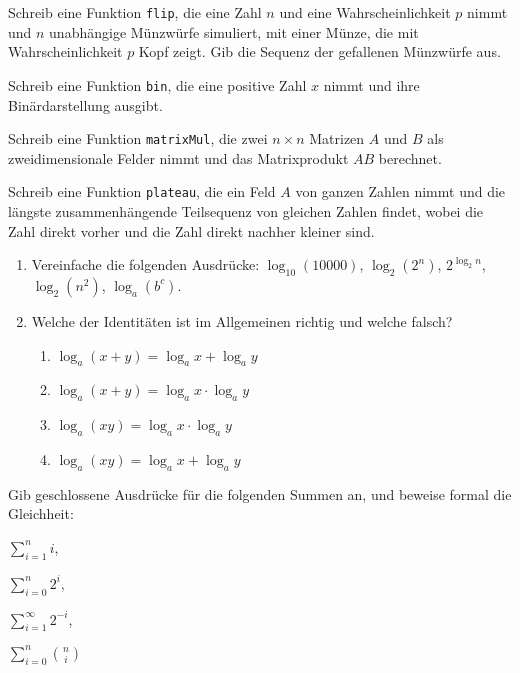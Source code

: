 \documentclass{uebung_cs}
\begin{document}
\begin{aufgabe}
    Schreib eine Funktion \texttt{flip}, die eine Zahl $n$ und eine Wahrscheinlichkeit $p$ nimmt und $n$ unabhängige Münzwürfe simuliert, mit einer Münze, die mit Wahrscheinlichkeit $p$ Kopf zeigt. Gib die Sequenz der gefallenen Münzwürfe aus.
\end{aufgabe}

\begin{aufgabe}[Binärzahlen]
    Schreib eine Funktion \texttt{bin}, die eine positive Zahl $x$ nimmt und ihre Binärdarstellung ausgibt.
\end{aufgabe}

\begin{aufgabe}[Matrixmultiplikation]
    Schreib eine Funktion \texttt{matrixMul}, die zwei $n\times n$ Matrizen $A$ und $B$ als zweidimensionale Felder nimmt und das Matrixprodukt $AB$ berechnet.
\end{aufgabe}

\begin{aufgabe}
    Schreib eine Funktion \texttt{plateau}, die ein Feld $A$ von ganzen Zahlen nimmt und die längste zusammenhängende Teilsequenz von gleichen Zahlen findet, wobei die Zahl direkt vorher und die Zahl direkt nachher kleiner sind.
\end{aufgabe}

\begin{aufgabe}[Logarithmus]\mbox{}
    \begin{enumerate}
        \item Vereinfache die folgenden Ausdrücke:
        $\log_{10}(10000)$,\;
        $\log_2(2^n)$,\;
        $2^{\log_2 n}$,\;
        $\log_2(n^2)$,\;
        $\log_a(b^c)$.
        \item Welche der Identitäten ist im Allgemeinen richtig und welche falsch?
        \begin{enumerate}
            \item $\log_a(x+y)= \log_a x+ \log_a y$
            \item $\log_a(x+y)= \log_a x \cdot \log_a y$
            \item $\log_a(xy)= \log_a x\cdot \log_a y$
            \item $\log_a(xy)= \log_a x+ \log_a y$
        \end{enumerate}
    \end{enumerate}
\end{aufgabe}

\begin{aufgabe}[Summen]
    Gib geschlossene Ausdrücke für die folgenden Summen an, und beweise formal die Gleichheit:
    \begin{enumerate*}
        \item $\sum_{i=1}^n i$,\;
        \item $\sum_{i=0}^n 2^{i}$,\;
        \item $\sum_{i=1}^\infty 2^{-i}$,\;
        \item $\sum_{i=0}^n \binom{n}{i}$
    \end{enumerate*}
\end{aufgabe}
\end{document}
